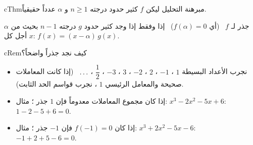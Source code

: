 \documentclass[12pt,a4paper]{article}
\newenvironment{BOX}[2]{\begin{otherlanguage}{english}\begin{arbox}{#1}{#2}}{\end{arbox}\end{otherlanguage}}
\newenvironment{khassia}[1][خاصية]{\begin{BOX}{cThm}{#1}}{\end{BOX}}
\newenvironment{molahada}[1][ملاحظة]{\begin{BOX}{cRem}{#1}}{\end{BOX}}
\renewcommand{\ldots}{\mathinner{\ldotp\ldotp\ldotp}}
\begin{document}
\begin{khassia}[مبرهنة التحليل]
ليكن $f$ كثير حدود درجته $n\ge1$ و $\alpha$ عدداً حقيقياً.\par
$\alpha$ جذر لـ $f$ \ (أي $f(\alpha)=0$) \ إذا وفقط إذا وجد كثير حدود $g$ درجته $n-1$ بحيث من أجل كل $x$: \quad $\boxed{f(x)=(x-\alpha)\,g(x)}$.
\end{khassia}
\begin{molahada}[كيف نجد جذراً واضحاً؟]
\begin{itemize}
\item نجرب الأعداد البسيطة $1$ ، $-1$ ، $2$ ، $-2$ ، $3$ ، $-3$ ، $\dfrac12$ ، $\ldots$ \ (إذا كانت المعاملات صحيحة والمعامل الرئيسي $1$ ، نجرب قواسم الحد الثابت).
\item إذا كان مجموع المعاملات معدوماً فإن $1$ جذر ؛ مثال: $x^3-2x^2-5x+6$: \ $1-2-5+6=0$.
\item إذا كان $f(-1)=0$ فإن $-1$ جذر ؛ مثال: $x^3+2x^2-5x-6$: \ $-1+2+5-6=0$.
\end{itemize}
\end{molahada}
\end{document}

